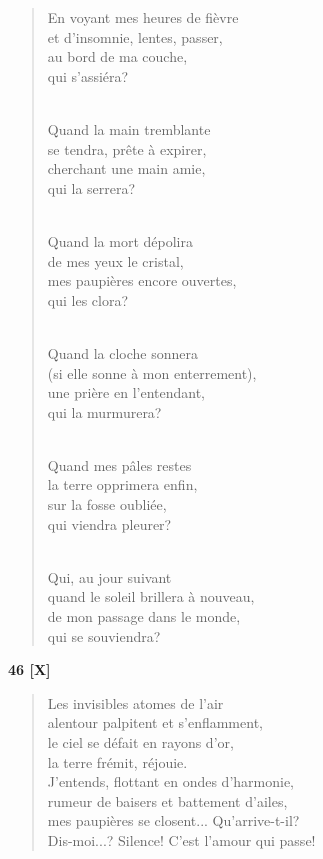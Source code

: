\documentclass[a4paper,12pt]{book}
\begin{document}
\begin{verse}
En voyant mes heures de fièvre \\
et d'insomnie, lentes, passer, \\
au bord de ma couche, \\
qui s'assiéra? \\ \

Quand la main tremblante \\
se tendra, prête à expirer, \\
cherchant une main amie, \\
qui la serrera? \\ \


Quand la mort dépolira \\
de mes yeux le cristal, \\
mes paupières encore ouvertes, \\
qui les clora? \\ \

Quand la cloche sonnera \\
(si elle sonne à mon enterrement), \\
une prière en l'entendant, \\
qui la murmurera? \\ \

Quand mes pâles restes \\
la terre opprimera enfin, \\
sur la fosse oubliée, \\
qui viendra pleurer? \\ \

Qui, au jour suivant \\
quand le soleil brillera à nouveau, \\
de mon passage dans le monde, \\
qui se souviendra? \\
\end{verse}

\bigskip

\begin{center} {\bf 46 [X]} \end{center}

\begin{verse}
Les invisibles atomes de l'air \\
alentour palpitent et s'enflamment, \\
le ciel se défait en rayons d'or, \\
la terre frémit, réjouie. \\
J'entends, flottant en ondes d'harmonie, \\
rumeur de baisers et battement d'ailes, \\
mes paupières se closent... Qu'arrive-t-il? \\
Dis-moi...? Silence! C'est l'amour qui passe! \\
\end{verse}
\end{document}
